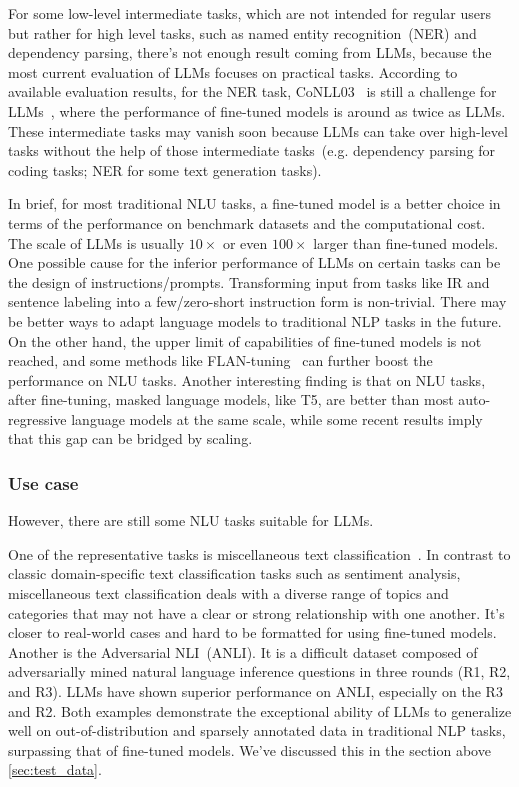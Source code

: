 \documentclass[manuscript,screen, nonacm]{acmart}
\begin{document}
For some low-level intermediate tasks, which are not intended for regular users but rather for high level tasks, such as named entity recognition~(NER) and dependency parsing, there's not enough result coming from LLMs, because the most current evaluation of LLMs focuses on practical tasks. According to available evaluation results, for the NER task, CoNLL03~\cite{sang2003introduction} is still a challenge for LLMs~\cite{qin2023chatgpt}, where the performance of fine-tuned models is around as twice as LLMs. These intermediate tasks may vanish soon because LLMs can take over high-level tasks without the help of those intermediate tasks~(e.g. dependency parsing for coding tasks; NER for some text generation tasks). 


In brief, for most traditional NLU tasks, a fine-tuned model is a better choice in terms of the performance on benchmark datasets and the computational cost. The scale of LLMs is usually $10\times$ or even $100\times$ larger than fine-tuned models. One possible cause for the inferior performance of LLMs on certain tasks can be the design of instructions/prompts. Transforming input from tasks like IR and sentence labeling into a few/zero-short instruction form is non-trivial. There may be better ways to adapt language models to traditional NLP tasks in the future. On the other hand, the upper limit of capabilities of fine-tuned models is not reached, and some methods like FLAN-tuning~\cite{longpre2023flan} can further boost the performance on NLU tasks. Another interesting finding is that on NLU tasks, after fine-tuning, masked language models, like T5\cite{raffel2020exploring}, are better than most auto-regressive language models at the same scale, while some recent results imply that this gap can be bridged by scaling\cite{chowdhery2022palm}. 
 

\subsubsection{Use case}
However, there are still some NLU tasks suitable for LLMs.

One of the representative tasks is miscellaneous text classification~\cite{liang2022holistic}. In contrast to classic domain-specific text classification tasks such as sentiment analysis, miscellaneous text classification deals with a diverse range of topics and categories that may not have a clear or strong relationship with one another. It's closer to real-world cases and hard to be formatted for using fine-tuned models.
Another is the Adversarial NLI~(ANLI)\cite{nie2019adversarial}. It is a difficult dataset composed of adversarially mined natural language inference questions in three rounds (R1, R2, and R3). LLMs have shown superior performance on ANLI, especially on the R3 and R2. Both examples demonstrate the exceptional ability of LLMs to generalize well on out-of-distribution and sparsely annotated data in traditional NLP tasks, surpassing that of fine-tuned models. We've discussed this in the section above \ref{sec:test_data}.
\end{document}
